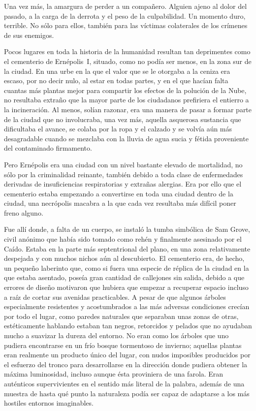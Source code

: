 Una vez más, la amargura de perder a un compañero. Alguien ajeno al dolor del pasado, a la carga de la derrota y el peso de la culpabilidad. Un momento duro, terrible. No sólo para ellos, también para las víctimas colaterales de los crímenes de sus enemigos.

\fancyparbreak
Pocos lugares en toda la historia de la humanidad resultan tan deprimentes como el cementerio de Ernépolis~I, situado, como no podía ser menos, en la zona sur de la ciudad. En una urbe en la que el valor que se le otorgaba a la ceniza era escaso, por no decir nulo, al estar en todas partes, y en el que hacían falta cuantas más plantas mejor para compartir los efectos de la polución de la Nube, no resultaba extraño que la mayor parte de los ciudadanos prefiriera el entierro a la incineración. Al menos, solían razonar, era una manera de pasar a formar parte de la ciudad que no involucraba, una vez más, aquella asquerosa sustancia que dificultaba el avance, se colaba por la ropa y el calzado y se volvía aún más desagradable cuando se mezclaba con la lluvia de agua sucia y fétida proveniente del contaminado firmamento.

Pero Ernépolis era una ciudad con un nivel bastante elevado de mortalidad, no sólo por la criminalidad reinante, también debido a toda clase de enfermedades derivadas de insuficiencias respiratorias y extrañas alergias. Era por ello que el cementerio estaba empezando a convertirse en toda una ciudad dentro de la ciudad, una necrópolis macabra a la que cada vez resultaba más difícil poner freno alguno.

Fue allí donde, a falta de un cuerpo, se instaló la tumba simbólica de Sam Grove, civil anónimo que había sido tomado como rehén y finalmente asesinado por el Caído. Estaba en la parte más septentrional del plano, en una zona relativamente despejada y con muchos nichos aún al descubierto. El cementerio era, de hecho, un pequeño laberinto que, como si fuera una especie de réplica de la ciudad en la que estaba asentado, poseía gran cantidad de callejones sin salida, debido a que errores de diseño motivaron que hubiera que empezar a recuperar espacio incluso a raíz de cortar sus avenidas practicables. A pesar de que algunos árboles especialmente resistentes y acostumbrados a las más adversas condiciones crecían por todo el lugar, como paredes naturales que separaban unas zonas de otras, estéticamente hablando estaban tan negros, retorcidos y pelados que no ayudaban mucho a suavizar la dureza del entorno. No eran como los árboles que uno pudiera encontrarse en un frío bosque tormentoso de invierno; aquellas plantas eran realmente un producto único del lugar, con nudos imposibles producidos por el esfuerzo del tronco para desarrollarse en la dirección donde pudiera obtener la máxima luminosidad, incluso aunque ésta proviniera de una farola. Eran auténticos supervivientes en el sentido más literal de la palabra, además de una muestra de hasta qué punto la naturaleza podía ser capaz de adaptarse a los más hostiles entornos imaginables.

